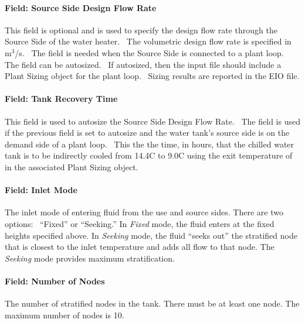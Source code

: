 \paragraph{Field: Source Side Design Flow
Rate}\label{field-source-side-design-flow-rate-thermalstoragehotwaterstratified}

This field is optional and is used to specify the design flow rate through the
Source Side of the water heater.~ The volumetric design flow rate is specified
in m\(^{3}\)/s.~ The field is needed when the Source Side is connected to a
plant loop.~ The field can be autosized.~ If autosized, then the input file
should include a Plant Sizing object for the plant loop.~ Sizing results are
reported in the EIO file.

\paragraph{Field: Tank Recovery Time}\label{field-tank-recovery-time-thermalstoragehotwaterstratified}

This field is used to autosize the Source Side Design Flow Rate.~ The field is
used if the previous field is set to autosize and the water tank's source side
is on the demand side of a plant loop.~ This the the time, in hours, that the
chilled water tank is to be indirectly cooled from 14.4C to 9.0C using the exit
temperature of in the associated Plant Sizing object.

\paragraph{Field: Inlet Mode}\label{field-inlet-mode-thermalstoragehotwaterstratified}

The inlet mode of entering fluid from the use and source sides. There are two
options:~ ``Fixed'' or ``Seeking.'' In \emph{Fixed} mode, the fluid enters at
the fixed heights specified above. In \emph{Seeking} mode, the fluid ``seeks
out'' the stratified node that is closest to the inlet temperature and adds all
flow to that node. The \emph{Seeking} mode provides maximum stratification.

\paragraph{Field: Number of Nodes}\label{field-number-of-nodes-thermalstoragehotwaterstratified}

The number of stratified nodes in the tank. There must be at least one node. The
maximum number of nodes is 10.

